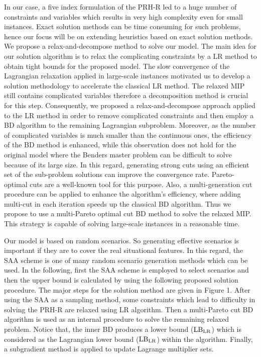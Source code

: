 \documentclass[review]{elsarticle}
\begin{document}
In our case, a five index formulation of the PRH-R led to a huge number of constraints and variables which results in very high complexity even for small instances. Exact solution methods can be time consuming for such problems, hence our focus will be on extending heuristics based on exact solution methods. We propose a relax-and-decompose method to solve our model. The main idea for our solution algorithm is to relax the complicating constraints by a LR method to obtain tight bounds for the proposed model. The slow convergence of the Lagrangian relaxation applied in large-scale instances motivated us to develop a solution methodology to accelerate the classical LR method. The relaxed MIP still contains complicated variables therefore a decomposition method is crucial for this step. Consequently, we proposed a relax-and-decompose approach applied to the LR method in order to remove complicated constraints and then employ a BD algorithm to the remaining Lagrangian subproblem. Moreover, as the number of complicated variables is much smaller than the continuous ones, the efficiency of the BD method is enhanced, while this observation   does not hold for the original model where the Benders master problem can be difficult to solve because of its large size. In this regard, generating strong cuts using an efficient set of the sub-problem solutions can improve the convergence rate. Pareto-optimal cuts are a well-known tool for this purpose. Also, a multi-generation cut procedure can be applied to enhance the algorithm's efficiency, where adding multi-cut in each iteration speeds up the classical BD algorithm. Thus we propose to use a multi-Pareto optimal cut BD method to solve the relaxed MIP. This strategy is capable of solving large-scale instances in a reasonable time.

 Our model is based on random scenarios. So generating effective scenarios is important if they are to cover the real situational features. In this regard, the SAA scheme is one of many random scenario generation methods which can be used. In the following, first the SAA scheme is employed to select scenarios and then the upper bound is calculated by using the following proposed solution procedure. The major steps for the solution method are given in Figure 1. After using the SAA as a sampling method, some constraints which lead to difficulty in solving the PRH-R are relaxed using LR algorithm. Then a multi-Pareto cut BD algorithm is used as an internal procedure to solve the remaining relaxed problem. Notice that, the inner BD produces a lower bound (${\rm LB_{LR}}$) which is considered as the Lagrangian lower bound (${\rm LB_{LR}}$) within the algorithm. Finally, a subgradient method is applied to update Lagrange multiplier sets.
\end{document}
